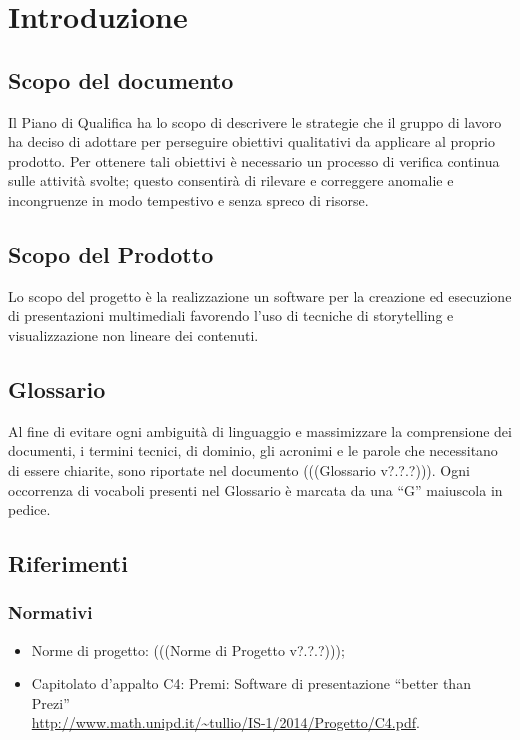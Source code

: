 \section{Introduzione}
\subsection{Scopo del documento}
Il Piano di Qualifica ha lo scopo di descrivere le strategie che il gruppo di lavoro ha deciso di adottare per perseguire obiettivi qualitativi da applicare al proprio prodotto. Per ottenere tali obiettivi è necessario un processo di verifica continua sulle attività svolte; questo consentirà di rilevare e correggere anomalie e incongruenze in modo tempestivo e senza spreco di risorse.
\subsection{Scopo del Prodotto}
Lo scopo del progetto è la realizzazione un software per la creazione ed esecuzione di presentazioni multimediali favorendo l’uso di tecniche di storytelling e visualizzazione non lineare dei contenuti.
\subsection{Glossario}
Al fine di evitare ogni ambiguità di linguaggio e massimizzare la comprensione dei documenti, i termini tecnici, di dominio, gli acronimi e le parole che necessitano di essere chiarite, sono riportate nel documento (((Glossario v?.?.?))). Ogni occorrenza di vocaboli presenti nel Glossario è marcata da una “G” maiuscola in pedice.
\subsection{Riferimenti}

\subsubsection{Normativi}
\begin{itemize}


\item Norme di progetto: (((Norme di Progetto v?.?.?)));
\item Capitolato d’appalto C4: Premi: Software di presentazione “better than Prezi” \\
\url{http://www.math.unipd.it/~tullio/IS-1/2014/Progetto/C4.pdf}.
\end{itemize}
